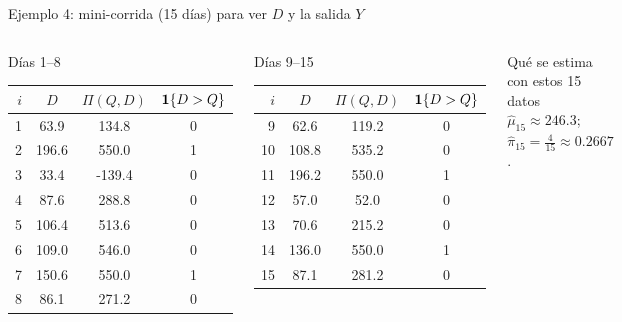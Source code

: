 \documentclass[aspectratio=1610, 9pt]{beamer}
\begin{document}
\begin{frame}{Ejemplo 4: mini-corrida (15 días) para ver $D$ y la salida $Y$}
\scriptsize
\begin{columns}[T]
\begin{block}{Días 1--8}
\centering
\setlength{\tabcolsep}{4pt}
\begin{tabular}{@{}rccc@{}}
\toprule
$i$ & $D$ & $\Pi(Q,D)$ & $\mathbf{1}\{D>Q\}$ \\
\midrule
1 & 63.9 & 134.8 & 0 \\
2 & 196.6 & 550.0 & 1 \\
3 & 33.4 & -139.4 & 0 \\
4 & 87.6 & 288.8 & 0 \\
5 & 106.4 & 513.6 & 0 \\
6 & 109.0 & 546.0 & 0 \\
7 & 150.6 & 550.0 & 1 \\
8 & 86.1 & 271.2 & 0 \\
\bottomrule
\end{tabular}
\end{block}

\begin{block}{Días 9--15}
\centering
\setlength{\tabcolsep}{4pt}
\begin{tabular}{@{}rccc@{}}
\toprule
$i$ & $D$ & $\Pi(Q,D)$ & $\mathbf{1}\{D>Q\}$ \\
\midrule
9 & 62.6 & 119.2 & 0 \\
10 & 108.8 & 535.2 & 0 \\
11 & 196.2 & 550.0 & 1 \\
12 & 57.0 & 52.0 & 0 \\
13 & 70.6 & 215.2 & 0 \\
14 & 136.0 & 550.0 & 1 \\
15 & 87.1 & 281.2 & 0 \\
\bottomrule
\end{tabular}
\end{block}

\begin{alertblock}{Qué se estima con estos 15 datos}
$\widehat{\mu}_{15}\approx 246.3$;\quad
$\widehat{\pi}_{15}=\frac{4}{15}\approx 0.2667$.
\end{alertblock}
\end{columns}
\end{frame}
\end{document}
